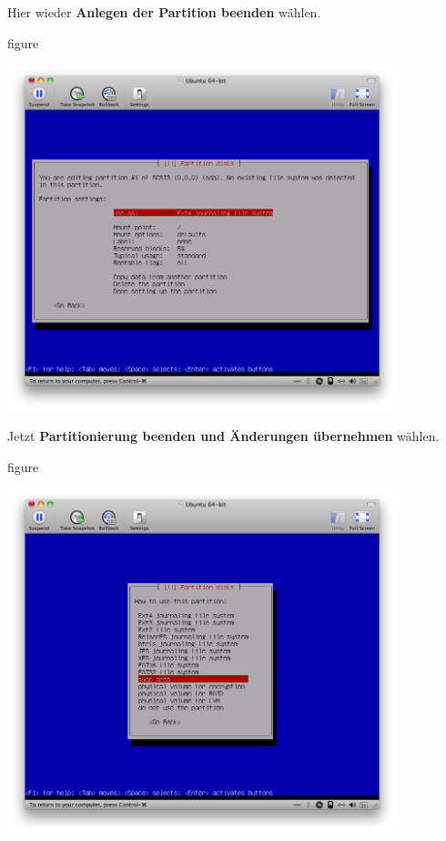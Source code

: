 Hier wieder \textbf{Anlegen der Partition beenden} wählen.

\begin{nofloat}{figure}
\begin{center}
\includegraphics[width=0.85\textwidth]{screenshots/18_ubuntu_install.png}
\end{center}
\end{nofloat}

\pagebreak
Jetzt \textbf{Partitionierung beenden und Änderungen übernehmen} wählen.

\begin{nofloat}{figure}
\begin{center}
\includegraphics[width=0.85\textwidth]{screenshots/19_ubuntu_install.png}
\end{center}
\end{nofloat}

